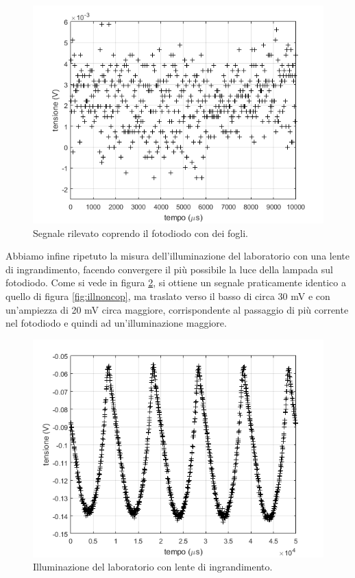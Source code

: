 \documentclass[journal, a4paper]{IEEEtran}
\begin{document}
\begin{figure}[htp]
\centering
\includegraphics[scale=.5]{es4_copertofoglio_0-01_50k}
\caption{Segnale rilevato coprendo il fotodiodo con dei fogli.}
\label{fig:illumfogli}
\end{figure} 

Abbiamo infine ripetuto la misura dell'illuminazione del laboratorio con una lente di ingrandimento, facendo convergere il più possibile la luce della lampada sul fotodiodo. Come si vede in figura \ref{fig:lente}, si ottiene un segnale praticamente identico a quello di figura \ref{fig:illnoncop}, ma traslato verso il basso di circa 30 mV e con un'ampiezza di 20 mV circa maggiore, corrispondente al passaggio di più corrente nel fotodiodo e quindi ad un'illuminazione maggiore.

\begin{figure}[htp]
\centering
\includegraphics[scale=.5]{es4_noncoperto_lente_0-05_20k}
\caption{Illuminazione del laboratorio con lente di ingrandimento.}
\label{fig:lente}
\end{figure}
\end{document}
